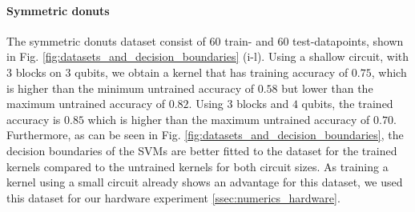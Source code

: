\documentclass[twocolumn,superscriptaddress,nofootinbib]{revtex4-2}
\begin{document}
\paragraph{Symmetric donuts}
    The symmetric donuts dataset consist of 60 train- and 60 test-datapoints, shown in Fig. \ref{fig:datasets_and_decision_boundaries} (i-l).
    Using a shallow circuit, with $3$ blocks on $3$ qubits, we obtain a kernel that has training accuracy of $0.75$, which is higher than the minimum untrained accuracy of $0.58$ but lower than the maximum untrained accuracy of $0.82$. Using $3$ blocks and $4$ qubits, the trained accuracy is $0.85$ which is higher than the maximum untrained accuracy of $0.70$. Furthermore, as can be seen in Fig. \ref{fig:datasets_and_decision_boundaries}, the decision boundaries of the \acp{SVM} are better fitted to the dataset for the trained kernels compared to the untrained kernels for both circuit sizes. As training a kernel using a small circuit already shows an advantage for this dataset, we used this dataset for our hardware experiment \ref{ssec:numerics_hardware}.
    
\end{document}
